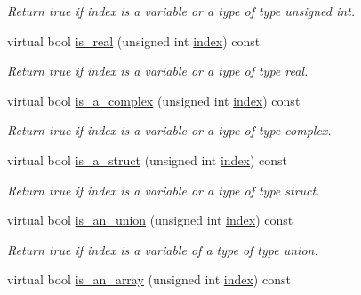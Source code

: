 \begin{DoxyCompactItemize}
\begin{DoxyCompactList}\small\item\em Return true if index is a variable or a type of type unsigned int. \end{DoxyCompactList}\item 
virtual bool \hyperlink{classBehavioralHelper_a33f288afc86fcde819e290640fce8843}{is\+\_\+real} (unsigned int \hyperlink{tutorial__pact__2019_2Introduction_2third_2include_2Keccak_8h_a028c9bdc8344cca38ab522a337074797}{index}) const
\begin{DoxyCompactList}\small\item\em Return true if index is a variable or a type of type real. \end{DoxyCompactList}\item 
virtual bool \hyperlink{classBehavioralHelper_a7429077b95289a4988649bc8cc58ae06}{is\+\_\+a\+\_\+complex} (unsigned int \hyperlink{tutorial__pact__2019_2Introduction_2third_2include_2Keccak_8h_a028c9bdc8344cca38ab522a337074797}{index}) const
\begin{DoxyCompactList}\small\item\em Return true if index is a variable or a type of type complex. \end{DoxyCompactList}\item 
virtual bool \hyperlink{classBehavioralHelper_a4201bb60f819cbef8a2533a5da360991}{is\+\_\+a\+\_\+struct} (unsigned int \hyperlink{tutorial__pact__2019_2Introduction_2third_2include_2Keccak_8h_a028c9bdc8344cca38ab522a337074797}{index}) const
\begin{DoxyCompactList}\small\item\em Return true if index is a variable or a type of type struct. \end{DoxyCompactList}\item 
virtual bool \hyperlink{classBehavioralHelper_a0d2138dc05ca289fb0bd62ebfb09f476}{is\+\_\+an\+\_\+union} (unsigned int \hyperlink{tutorial__pact__2019_2Introduction_2third_2include_2Keccak_8h_a028c9bdc8344cca38ab522a337074797}{index}) const
\begin{DoxyCompactList}\small\item\em Return true if index is a variable of a type of type union. \end{DoxyCompactList}\item 
virtual bool \hyperlink{classBehavioralHelper_ac060a3b1575371be4bc553b158cdd5da}{is\+\_\+an\+\_\+array} (unsigned int \hyperlink{tutorial__pact__2019_2Introduction_2third_2include_2Keccak_8h_a028c9bdc8344cca38ab522a337074797}{index}) const

\end{DoxyCompactItemize}
